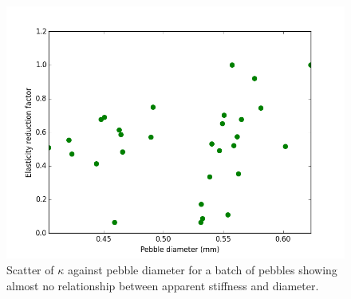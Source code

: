 \begin{figure}[!ht]
\centering
    \includegraphics[width=\imagewidth]{chapters/figures/fzk-kappa-dp-scatter.png}
    \caption{Scatter of $\kappa$ against pebble diameter for a batch of \lis pebbles showing almost no relationship between apparent stiffness and diameter.}
    \label{fig:fzk-kappa-dp-scatter}
\end{figure}


